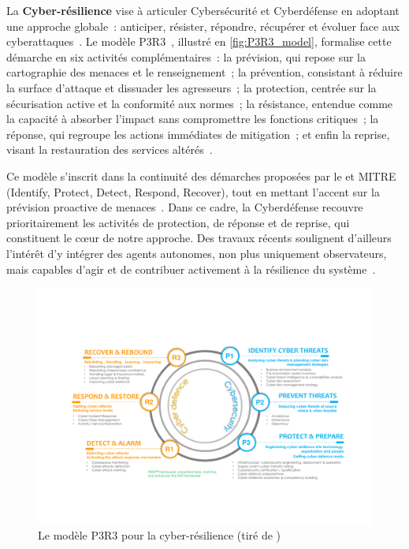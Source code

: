 La \textbf{Cyber-résilience} vise à articuler Cybersécurité et Cyberdéfense en adoptant une approche globale~: anticiper, résister, répondre, récupérer et évoluer face aux cyberattaques~\cite{NISTresilience}. Le modèle P3R3~\cite{Theron2013P3R3}, illustré en \autoref{fig:P3R3_model}, formalise cette démarche en six activités complémentaires~: la prévision, qui repose sur la cartographie des menaces et le renseignement~; la prévention, consistant à réduire la surface d'attaque et dissuader les agresseurs~; la protection, centrée sur la sécurisation active et la conformité aux normes~; la résistance, entendue comme la capacité à absorber l'impact sans compromettre les fonctions critiques~; la réponse, qui regroupe les actions immédiates de mitigation~; et enfin la reprise, visant la restauration des services altérés~\cite{Theron2013P3R3}.

Ce modèle s'inscrit dans la continuité des démarches proposées par le  et MITRE (Identify, Protect, Detect, Respond, Recover), tout en mettant l'accent sur la prévision proactive de menaces~\cite{Theron2013P3R3}. Dans ce cadre, la Cyberdéfense recouvre prioritairement les activités de protection, de réponse et de reprise, qui constituent le cœur de notre approche. Des travaux récents soulignent d'ailleurs l'intérêt d'y intégrer des agents autonomes, non plus uniquement observateurs, mais capables d'agir et de contribuer activement à la résilience du système~\cite{Kott2023}.

\begin{figure}[h]
  \centering
  \includegraphics[width=\linewidth]{figures/P3R3.pdf}
  \caption{Le modèle P3R3 pour la cyber-résilience (tiré de \autocite{Kott2023})}
  \label{fig:P3R3_model}
\end{figure}

